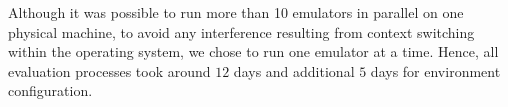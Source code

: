 
Although it was possible to run more than 10 emulators in parallel on one physical machine, to avoid any interference resulting from context switching within the operating system, we chose to run one emulator at a time. Hence, all evaluation processes took around $12$ days and additional $5$ days for environment configuration.




